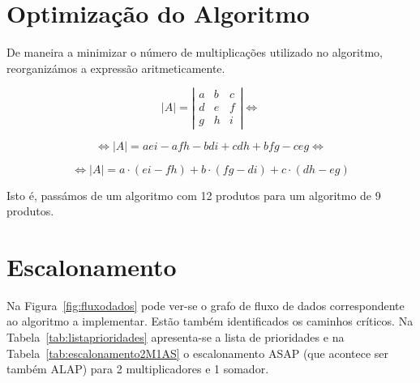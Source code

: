 \documentclass[a4paper]{article}
\begin{document}


\tableofcontents
\pagebreak

\section{Optimização do Algoritmo}
De maneira a minimizar o número de multiplicações utilizado no algoritmo, reorganizámos a expressão aritmeticamente.

\[
\left| A \right| = \left|
\begin{matrix}
a & b & c\\
d & e & f\\
g & h & i
\end{matrix}
\right| \Leftrightarrow\]

\[
\Leftrightarrow \left| A \right| = a e i - a f h - b d i + c d h + b f g - c e g \Leftrightarrow
\]

\[
\Leftrightarrow \left| A \right| = a \cdot ( e i - f h ) + b \cdot ( f g - d i ) + c \cdot ( d h - e g )
\]

Isto é, passámos de um algoritmo com 12 produtos para um algoritmo de 9 produtos.

\section{Escalonamento}

Na Figura~\ref{fig:fluxodados} pode ver-se o grafo de fluxo de dados correspondente ao algoritmo a implementar. Estão também identificados os caminhos críticos. Na Tabela~\ref{tab:listaprioridades} apresenta-se a lista de prioridades e na Tabela~\ref{tab:escalonamento2M1AS} o escalonamento ASAP (que acontece ser também ALAP) para 2 multiplicadores e 1 somador.
\end{document}
